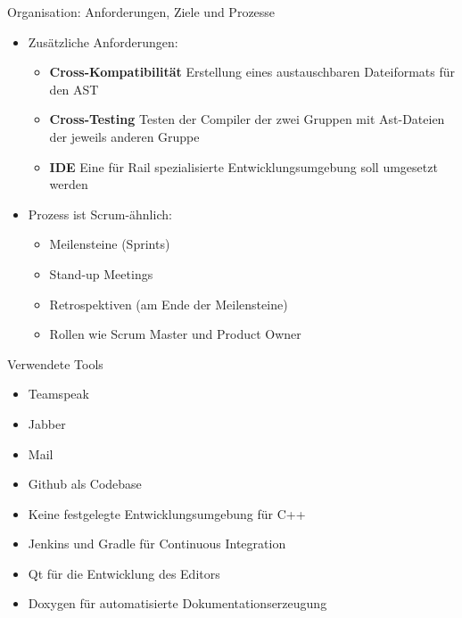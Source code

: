 \begin{frame}{Organisation: Anforderungen, Ziele und Prozesse}

	\pause
	\begin{itemize}
		\item Zus\"atzliche Anforderungen:
		\pause
		\begin{itemize}
			\item \textbf{\textcolor{fu-blue}{Cross-Kompatibilit\"at}} Erstellung eines austauschbaren Dateiformats f\"ur den AST
			\pause
			\item \textbf{\textcolor{fu-blue}{Cross-Testing}} Testen der Compiler der zwei Gruppen mit Ast-Dateien der jeweils anderen Gruppe
			\pause
			\item \textbf{\textcolor{fu-blue}{IDE}} Eine f\"ur Rail spezialisierte Entwicklungsumgebung soll umgesetzt werden
			\pause
		\end{itemize}
		\item Prozess ist Scrum-\"ahnlich:
		\pause
		\begin{itemize}
			\item Meilensteine (Sprints)
			\pause
			\item Stand-up Meetings
			\pause
			\item Retrospektiven (am Ende der Meilensteine)
			\pause
			\item Rollen wie Scrum Master und Product Owner
		\end{itemize}
	\end{itemize}

\end{frame}

\pagebreak


\begin{frame}{Verwendete Tools}

	\pause
	\begin{itemize}
		\item Teamspeak
		\pause
		\item Jabber
		\pause
		\item Mail 
		\pause
		\item Github als Codebase
		\pause
		\item Keine festgelegte Entwicklungsumgebung f\"ur C++
		\pause
		\item Jenkins und Gradle f\"ur Continuous Integration
		\pause
		\item Qt f\"ur die Entwicklung des Editors
		\pause
		\item Doxygen f\"ur automatisierte Dokumentationserzeugung
	\end{itemize}


\end{frame}


